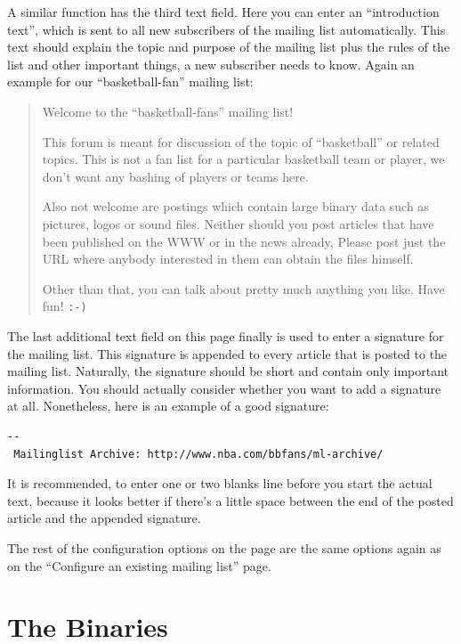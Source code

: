\documentclass[a4paper]{report}
\newcommand{\Index}[1]{#1\index{#1}}
\begin{document}
A similar function has the third text field. Here you can enter an
``\Index{introduction text}'', which is sent to all new subscribers of
the mailing list automatically. This text should explain the topic and
purpose of the mailing list plus the rules of the list and other
important things, a new subscriber needs to know. Again an example for
our ``basketball-fan'' mailing list:

\begin{quotation}

\centerline{Welcome to the ``basketball-fans'' mailing list!}

\bigskip

This forum is meant for discussion of the topic of ``basketball'' or
related topics. This is not a fan list for a particular basketball
team or player, we don't want any bashing of players or teams here.

Also not welcome are postings which contain large binary data such as
pictures, logos or sound files. Neither should you post articles that
have been published on the WWW or in the news already, Please post
just the URL where anybody interested in them can obtain the files
himself.

Other than that, you can talk about pretty much anything you like.
Have fun! \texttt{:-)}

\end{quotation}

The last additional text field on this page finally is used to enter a
\Index{signature} for the mailing list. This signature is appended to every
article that is posted to the mailing list. Naturally, the signature
should be short and contain only important information. You should
actually consider whether you want to add a signature at all.
Nonetheless, here is an example of a good signature:

\begin{verbatim}
--
 Mailinglist Archive: http://www.nba.com/bbfans/ml-archive/
\end{verbatim}

It is recommended, to enter one or two blanks line before you start
the actual text, because it looks better if there's a little space
between the end of the posted article and the appended signature.

The rest of the configuration options on the page are the same options
again as on the ``Configure an existing mailing list'' page.

\section{The Binaries}
\end{document}
